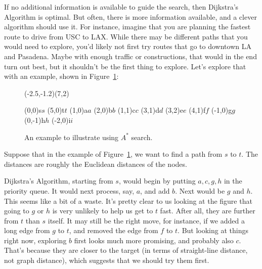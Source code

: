 If no additional information is available to guide the search, then
Dijkstra's Algorithm is optimal. But often, there is more information
available, and a clever algorithm should use it.
For instance, imagine that you are planning the fastest route to drive
from USC to LAX. While there may be different paths that you would
need to explore, you'd likely not first try routes that go to downtown
LA and Pasadena. Maybe with enough traffic or constructions, that
would in the end turn out best, but it shouldn't be the first thing to
explore. Let's explore that with an example, shown in Figure~\ref{fig:a-star}:

\begin{figure}
\begin{center}
\pspicture(-2.5,-1.2)(7,2)

\cnodeput[fillstyle=solid,fillcolor=lightgray](0,0){s}{$s$}
\cnodeput[fillstyle=solid,fillcolor=lightgray](5,0){t}{$t$}
\cnodeput(1,0){a}{$a$}
\cnodeput(2,0){b}{$b$}
\cnodeput(1,1){c}{$c$}
\cnodeput(3,1){d}{$d$}
\cnodeput(3,2){e}{$e$}
\cnodeput(4,1){f}{$f$}
\cnodeput(-1,0){g}{$g$}
\cnodeput(0,-1){h}{$h$}
\cnodeput(-2,0){i}{$i$}

 
 
 
 
 
 
 
 
 
 
 
 
 

\endpspicture
\end{center}
\caption{An example to illustrate using $A^*$ search.\label{fig:a-star}}
\end{figure}

Suppose that in the example of Figure~\ref{fig:a-star}, we want to
find a path from $s$ to $t$. 
The distances are roughly the Euclidean distances of the nodes.

Dijkstra's Algorithm, starting from $s$, would begin by putting $a, c,
g, h$ in the priority queue. It would next process, say, $a$, and add
$b$. Next would be $g$ and $h$. This seems like a bit of a waste. It's
pretty clear to us looking at the figure that going to $g$ or $h$ is
very unlikely to help us get to $t$ fast. After all, they are further
from $t$ than $s$ itself. It may still be the right move, for
instance, if we added a long edge from $g$ to $t$, and removed the
edge from $f$ to $t$. But looking at things right now, exploring $b$
first looks much more promising, and probably also $c$. That's because
they are closer to the target (in terms of straight-line distance, not
graph distance), which suggests that we should try them first.

